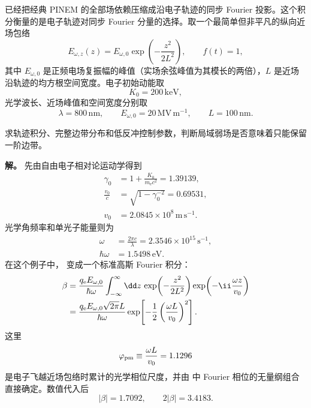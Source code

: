 
\begin{exbox}
 已经把经典 PINEM 的全部场依赖压缩成沿电子轨迹的同步 Fourier 投影。这个积分衡量的是电子轨迹对同步 Fourier 分量的选择。取一个最简单但非平凡的纵向近场包络
\begin{equation*}
 E_{\omega,z}(z)=E_{\omega,0}\exp\!\left(-\frac{z^2}{2L^2}\right),
 \qquad f(t)=1,
\end{equation*}
其中 $E_{\omega,0}$ 是正频电场复振幅的峰值（实场余弦峰值为其模长的两倍），$L$ 是近场沿轨迹的均方根空间宽度。电子初始动能取
\begin{equation*}
 K_0=200\,\mathrm{keV},
\end{equation*}
光学波长、近场峰值和空间宽度分别取
\begin{equation*}
 \lambda=800\,\mathrm{nm},\qquad
 E_{\omega,0}=20\,\mathrm{MV\,m^{-1}},\qquad
 L=100\,\mathrm{nm}.
\end{equation*}

求轨迹积分、完整边带分布和低反冲控制参数，判断局域弱场是否意味着只能保留一阶边带。

\textbf{解。} 先由自由电子相对论运动学得到
\begin{align*}
 \gamma_0
 &=1+\frac{K_0}{m_{\mathrm e} c^2}
 =1.39139,\\
 \frac{v_0}{c}
 &=\sqrt{1-\gamma_0^{-2}}
 =0.69531,\\
 v_0&=2.0845\times10^8\,\mathrm{m\,s^{-1}}.
\end{align*}
光学角频率和单光子能量则为
\begin{align*}
 \omega&=\frac{2\pi c}{\lambda}
 =2.3546\times10^{15}\,\mathrm{s^{-1}},\\
 \hbar\omega&=1.5498\,\mathrm{eV}.
\end{align*}
在这个例子中， 变成一个标准高斯 Fourier 积分：
\begin{align}
 \beta
 &=\frac{q_{\mathrm e} E_{\omega,0}}{\hbar\omega}
 \int_{-\infty}^{\infty}\dd z\,
 \exp\!\left(-\frac{z^2}{2L^2}\right)
 \exp\!\left(-\ii\frac{\omega z}{v_0}\right)\notag\\
 &=\frac{q_{\mathrm e} E_{\omega,0}\sqrt{2\pi}L}{\hbar\omega}
 \exp\!\left[-\frac12\left(\frac{\omega L}{v_0}\right)^2\right].
 \label{eq:pinem-gaussian-beta-dp65}
\end{align}
这里
\begin{equation*}
 \varphi_{\rm pm}\equiv\frac{\omega L}{v_0}=1.1296
\end{equation*}
是电子飞越近场包络时累计的光学相位尺度，并由 中 Fourier 相位的无量纲组合直接确定。数值代入后
\begin{equation}
 {|\beta|=1.7092,\qquad 2|\beta|=3.4183.}
 \label{eq:pinem-gaussian-beta-number-dp65}
\end{equation}


\end{exbox}
